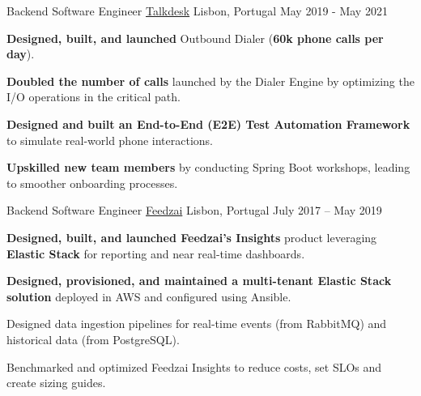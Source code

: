 \begin{cventries}
  \cventry
    {Backend Software Engineer}
    {\href{https://www.talkdesk.com/}{Talkdesk}}
    {Lisbon, Portugal}
    {May 2019 - May 2021}
    {
      \begin{cvitems}
        \item \textbf{Designed, built, and launched} Outbound Dialer (\textbf{60k phone calls per day}).
        \item \textbf{Doubled the number of calls} launched by the Dialer Engine by optimizing the I/O operations in the critical path.
        \item \textbf{Designed and built an End-to-End (E2E) Test Automation Framework} to simulate real-world phone interactions.
        \item \textbf{Upskilled new team members} by conducting Spring Boot workshops, leading to smoother onboarding processes.
      \end{cvitems}
      \vspace{4mm}
    }

    
  \cventry
    {Backend Software Engineer}
    {\href{https://feedzai.com/}{Feedzai}}
    {Lisbon, Portugal}
    {July 2017 – May 2019}
    {
      \begin{cvitems}
        \item \textbf{Designed, built, and launched Feedzai's Insights} product leveraging \textbf{Elastic Stack} for reporting and near real-time dashboards.
        \item \textbf{Designed, provisioned, and maintained a multi-tenant Elastic Stack solution} deployed in AWS and configured using Ansible.
        \item Designed data ingestion pipelines for real-time events (from RabbitMQ) and historical data (from PostgreSQL).
        \item Benchmarked and optimized Feedzai Insights to reduce costs, set SLOs and create sizing guides.
      \end{cvitems}
      \vspace{4mm}
    }


\end{cventries}
